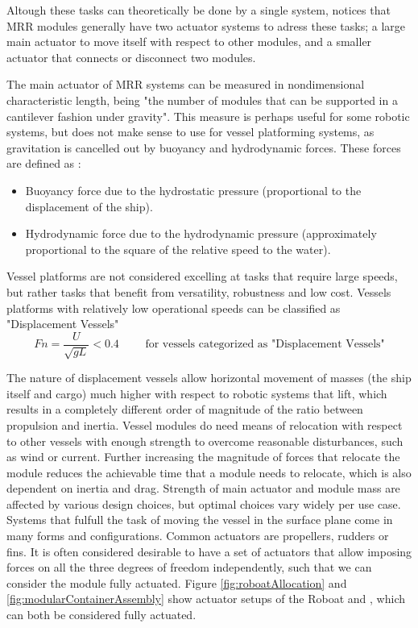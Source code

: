 Altough these tasks can theoretically be done by a single system, \citet{seo2019modular} notices that MRR modules generally have two actuator systems to adress these tasks; a large main actuator to move itself with respect to other modules, and a smaller actuator that connects or disconnect two modules. 

The main actuator of MRR systems can be measured in nondimensional characteristic length, being "the number of modules that can be supported in a cantilever fashion under gravity"\cite{seo2019modular}. This measure is perhaps useful for some robotic systems, but does not make sense to use for vessel platforming systems, as gravitation is cancelled out by buoyancy and hydrodynamic forces. These forces are defined as \citet{fossen2011handbook}:
\begin{itemize}
	\item Buoyancy force due to the hydrostatic pressure (proportional to the displacement of the ship).
	\item Hydrodynamic force due to the hydrodynamic pressure (approximately proportional to the square of
	the relative speed to the water).
\end{itemize}

Vessel platforms are not considered excelling at tasks that require large speeds, but rather tasks that benefit from versatility, robustness  and low cost\cite{seo2019modular}. Vessels platforms with relatively low operational speeds can be classified as "Displacement Vessels" \citet{faltinsen2005hydrodynamics}
\begin{equation}
	Fn =  \frac{U}{\sqrt{gL}} < 0.4 \mbox{ }\mbox{ }\mbox{ }\mbox{ for vessels categorized as "Displacement Vessels"}
\end{equation} 

The nature of displacement vessels allow horizontal movement of masses (the ship itself and cargo) much higher with respect to robotic systems that lift, which results in a completely different order of magnitude of the ratio between propulsion and inertia. 
Vessel modules do need means of relocation with respect to other vessels with enough strength to overcome reasonable disturbances, such as wind or current. Further increasing the magnitude of forces that relocate the module reduces the achievable time that a module needs to relocate, which is also dependent on inertia and drag. Strength of main actuator and module mass are affected by various design choices, but optimal choices vary widely per use case. 
Systems that fulfull the task of moving the vessel in the surface plane come in many forms and configurations. Common actuators are propellers, rudders or fins. It is often considered desirable to have a set of actuators that allow imposing forces on all the three degrees of freedom independently, such that we can consider the module fully actuated. Figure \ref{fig:roboatAllocation} and \ref{fig:modularContainerAssembly} show actuator setups of the Roboat and \citet{o2014self}, which can both be considered fully actuated. 

